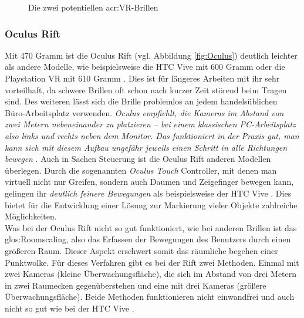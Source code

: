 \begin{figure}%
    \centering
    \qquad
    \caption{Die zwei potentiellen \acrshort{acr:VR}-Brillen}\label{fig:VR-Brillen}%
\end{figure}

\subsubsection{Oculus Rift}
Mit 470 Gramm ist die Oculus Rift (vgl. Abbildung \ref{fig:Oculus}) deutlich leichter als andere Modelle, wie beispielsweise die HTC Vive mit 600 Gramm oder die Playstation VR mit 610 Gramm \cite{bib:OculusTestTragekomfort}. Dies ist für längeres Arbeiten mit ihr sehr vorteilhaft, da schwere Brillen oft schon nach kurzer Zeit störend beim Tragen sind. Des weiteren lässt sich die Brille problemlos an jedem handelsüblichen Büro-Arbeitsplatz verwenden. \textit{\glqq Oculus empfiehlt, die Kameras im Abstand von zwei Metern nebeneinander zu platzieren – bei einem klassischen PC-Arbeitsplatz also links und rechts neben dem Monitor. Das funktioniert in der Praxis gut, man kann sich mit diesem Aufbau ungefähr jeweils einen Schritt in alle Richtungen bewegen\grqq} \cite{bib:OculusTouchTest}. Auch in Sachen Steuerung ist die Oculus Rift anderen Modellen überlegen. Durch die sogenannten \textit{Oculus Touch} Controller, mit denen man virtuell nicht nur Greifen, sondern auch Daumen und Zeigefinger bewegen kann, gelingen ihr \textit{\glqq deutlich feinere Bewegungen\grqq} als beispielsweise der HTC Vive \cite{bib:OculusTouchTest}. Dies bietet für die Entwicklung einer Lösung zur Markierung vieler Objekte zahlreiche Möglichkeiten.\\

Was bei der Oculus Rift nicht so gut funktioniert, wie bei anderen Brillen ist das \gls{glos:Roomscaling}, also das Erfassen der Bewegungen des Benutzers durch einen größeren Raum. Dieser Aspekt erschwert somit das räumliche begehen einer Punktwolke. Für dieses Verfahren gibt es bei der Rift zwei Methoden. Einmal mit zwei Kameras (kleine Überwachungsfläche), die sich im Abstand von drei Metern in zwei Raumecken gegenüberstehen und eine mit drei Kameras (größere Überwachungsfläche). Beide Methoden funktionieren nicht einwandfrei und auch nicht so gut wie bei der HTC Vive \cite{bib:OculusTouchTest}.

